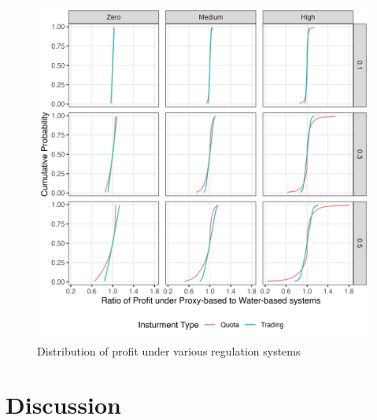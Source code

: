\documentclass[
]{article}
\begin{document}
\begin{figure}[H]

{\centering \includegraphics{figures/g_profit_ratio} 

}

\caption{Distribution of profit under various regulation systems}\label{fig:distributional-equity}
\end{figure}

\section{Discussion}\label{discussion}
\end{document}

